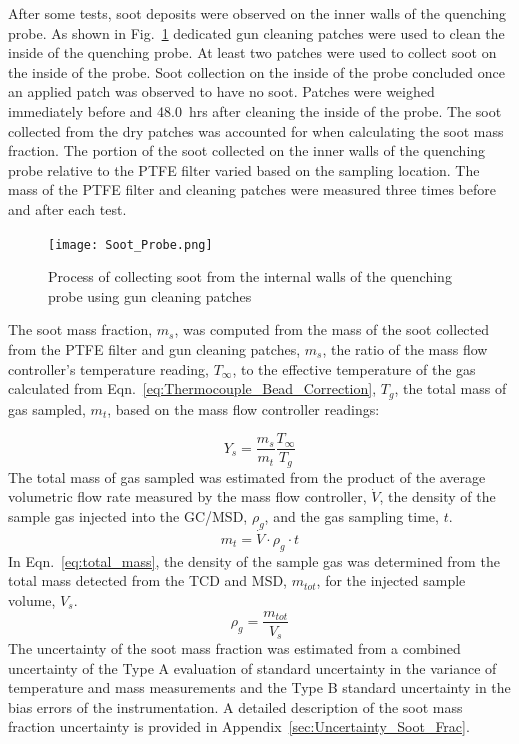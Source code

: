 \documentclass[12pt]{article}
\begin{document}
After some tests, soot deposits were observed on the inner walls of the quenching probe. As shown in Fig.~\ref{fig:Soot_Probe_Setup} dedicated gun cleaning patches were used to clean the inside of the quenching probe. At least two patches were used to collect soot on the inside of the probe. Soot collection on the inside of the probe concluded once an applied patch was observed to have no soot. Patches were weighed immediately before and \SI{48.0}{hrs} after cleaning the inside of the probe. The soot collected from the dry patches was accounted for when calculating the soot mass fraction. The portion of the soot collected on the inner walls of the quenching probe relative to the PTFE filter varied based on the sampling location. The mass of the PTFE filter and cleaning patches were measured three times before and after each test.

\begin{figure}[ht!]
	\centering
\texttt{[image: Soot\_Probe.png]}
	\caption[Process for cleaning soot probe]{Process of collecting soot from the internal walls of the quenching probe using gun cleaning patches}
	\label{fig:Soot_Probe_Setup}
\end{figure}

The soot mass fraction, $m_{s}$, was computed from the mass of the soot collected from the PTFE filter and gun cleaning patches, $m_{s}$, the ratio of the mass flow controller's temperature reading, $T_{\infty}$, to the effective temperature of the gas calculated from Eqn.~\ref{eq:Thermocouple_Bead_Correction}, $T_{g}$, the total mass of gas sampled, $m_{t}$, based on the mass flow controller readings:

\begin{equation}\label{eq:soot_mass_frac}
Y_{s}= \frac{m_{s}}{m_{t}}\frac{T_{\infty}}{T_{g}}
\end{equation}
The total mass of gas sampled was estimated from the product of the average volumetric flow rate measured by the mass flow controller, $\dot{V}$, the density of the sample gas injected into the GC/MSD, $\rho_{g}$, and the gas sampling time, $t$.
\begin{equation}\label{eq:total_mass}
m_{t}= \dot{V}\cdot \rho_{g}\cdot t
\end{equation}
In Eqn.~\ref{eq:total_mass}, the density of the sample gas was determined from the total mass detected from the TCD and MSD, $m_{tot}$, for the injected sample volume, $V_{s}$.
\begin{equation}\label{eq:gas_density}
\rho_{g}= \frac{m_{tot}}{V_{s}}
\end{equation}
The uncertainty of the soot mass fraction was estimated from a combined uncertainty of the Type A evaluation of standard uncertainty in the variance of temperature and mass measurements and the Type B standard uncertainty in the bias errors of the instrumentation. A detailed description of the soot mass fraction uncertainty is provided in Appendix~\ref{sec:Uncertainty_Soot_Frac}.
\end{document}

